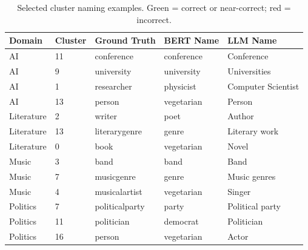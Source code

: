 \documentclass[11pt,a4paper]{article}
\begin{document}
\begin{table}[h]
\centering
\caption{Selected cluster naming examples. \textcolor{green!60!black}{Green}
= correct or near-correct; \textcolor{red!70!black}{red} = incorrect.}
\label{tab:examples}
\setlength{\tabcolsep}{4pt}
\small
\begin{tabularx}{\textwidth}{l l X X X}
\toprule
\textbf{Domain} & \textbf{Cluster} & \textbf{Ground Truth}
  & \textbf{BERT Name} & \textbf{LLM Name} \\
\midrule
AI         & 11 & conference     & \textcolor{green!60!black}{conference}     & \textcolor{green!60!black}{Conference} \\
AI         & 9  & university     & \textcolor{green!60!black}{university}     & \textcolor{green!60!black}{Universities} \\
AI         & 1  & researcher     & \textcolor{green!60!black}{physicist}      & \textcolor{green!60!black}{Computer Scientist} \\
AI         & 13 & person         & \textcolor{red!70!black}{vegetarian}       & \textcolor{green!60!black}{Person} \\
\midrule
Literature & 2  & writer         & \textcolor{green!60!black}{poet}           & \textcolor{green!60!black}{Author} \\
Literature & 13 & literarygenre  & \textcolor{green!60!black}{genre}          & \textcolor{orange!80!black}{Literary work} \\
Literature & 0  & book           & \textcolor{red!70!black}{vegetarian}       & \textcolor{green!60!black}{Novel} \\
\midrule
Music      & 3  & band           & \textcolor{green!60!black}{band}           & \textcolor{green!60!black}{Band} \\
Music      & 7  & musicgenre     & \textcolor{green!60!black}{genre}          & \textcolor{green!60!black}{Music genres} \\
Music      & 4  & musicalartist  & \textcolor{red!70!black}{vegetarian}       & \textcolor{green!60!black}{Singer} \\
\midrule
Politics   & 7  & politicalparty & \textcolor{green!60!black}{party}          & \textcolor{green!60!black}{Political party} \\
Politics   & 11 & politician     & \textcolor{green!60!black}{democrat}       & \textcolor{green!60!black}{Politician} \\
Politics   & 16 & person         & \textcolor{red!70!black}{vegetarian}       & \textcolor{red!70!black}{Actor} \\

\end{tabularx}
\end{table}
\end{document}
